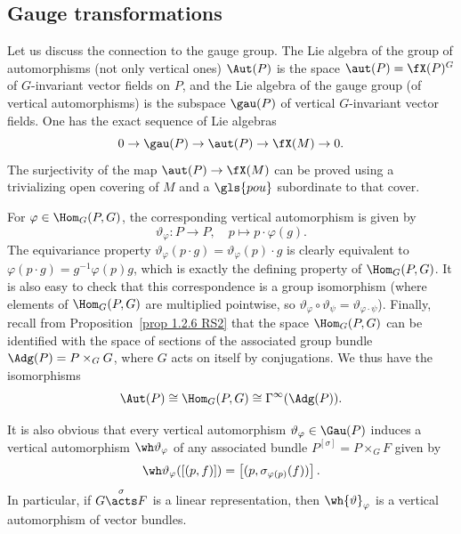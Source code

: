 \subsection{Gauge transformations}


Let us discuss the connection to the gauge group. The Lie algebra of the group of automorphisms (not only vertical ones) $\Aut(P)$ is the space $\aut(P)=\fX(P)^G$ of $G$-invariant vector fields on $P$, and the Lie algebra of the gauge group (of vertical automorphisms) is the subspace $\gau(P)$ of vertical $G$-invariant vector fields. One has the exact sequence of Lie algebras
\[0\to \gau(P)\to \aut(P)\to \fX(M)\to 0.\]
The surjectivity of the map $\aut(P)\to \fX(M)$ can be proved using a trivializing open covering of $M$ and a $\gls{pou}$ subordinate to that cover. 


For $\varphi\in \Hom_G(P,G)$, the corresponding vertical automorphism is given by
\[\vartheta_\varphi:P\to P,\quad p\mapsto p\cdot \varphi(g).\label{eq 1.8.2 RS2}\]
The equivariance property $\vartheta_\varphi(p\cdot g)=\vartheta_\varphi(p)\cdot g$ is clearly equivalent to $\varphi(p\cdot g)=g^{-1}\varphi(p)g$, which is exactly the defining property of $\Hom_G(P,G)$. It is also easy to check that this correspondence is a group isomorphism (where elements of $\Hom_G(P,G)$ are multiplied pointwise, so $\vartheta_\varphi\circ\vartheta_\psi=\vartheta_{\varphi\cdot\psi}$). Finally, recall from Proposition~\ref{prop 1.2.6 RS2} that the space $\Hom_G(P,G)$ can be identified with the space of sections of the associated group bundle $\Adg(P)=P\times_G G$, where $G$ acts on itself by conjugations. We thus have the isomorphisms
\[\Aut(P)\cong \Hom_G(P,G)\cong \Gamma^\infty(\Adg(P)).\]

It is also obvious that every vertical automorphism $\vartheta_\varphi\in\Gau(P)$ induces a vertical automorphism $\wh\vartheta_\varphi$ of any associated bundle $P^{[\sigma]}=P\times_G F$ given by
\[\wh\vartheta_\varphi([(p,f)])=\left[(p,\sigma_{\varphi(p)}(f))\right].\]
In particular, if $G\overset{\sigma}{\acts}F$ is a linear representation, then $\wh{\vartheta}_\varphi$ is a vertical automorphism of vector bundles.



